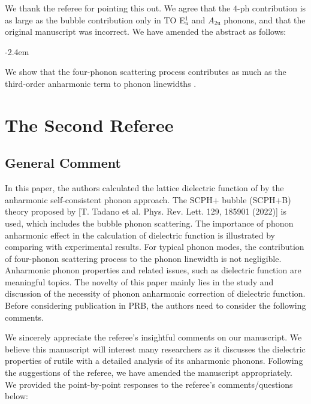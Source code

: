\documentclass[luatex,onecolumn,showpacs,aps,preprint,prb,amsfonts,amsmath,amssymb,floatfix,groupedaddress, longbibliography]{revtex4-2}
\renewenvironment{quote}{\begin{fquote}\advance\leftmargini -2.4em\begin{oldquote}}{\end{oldquote}\end{fquote}}
\newenvironment{fquote}
  {\def\FrameCommand{
	\fboxsep=0.6em %
	\fcolorbox{black}{white}}%
    \MakeFramed {\advance\hsize-2\width \FrameRestore}
    \begin{minipage}{\linewidth}
  }
  {\end{minipage}\endMakeFramed}
\providecommand{\DIFadd}[1]{{\protect\color{blue}\uwave{#1}}} %
\begin{document}
\AR  We thank the referee for pointing this out. We agree that the $4$-ph contribution is as large as the bubble contribution only in TO E$_{u}^{1}$ and $A_{\mathrm{2u}}$ phonons, and that the original manuscript was incorrect. We have amended the abstract as follows:

\begin{quote}
We show that the four-phonon scattering process contributes as much as the third-order anharmonic term to phonon linewidths \DIFadd{of some phonon modes}.
\end{quote}


% 
% 

\newpage
\section{The Second Referee}

\subsection{General Comment}

\RC In this paper, the authors calculated the lattice dielectric function of  by the anharmonic self-consistent phonon approach. The SCPH+
bubble (SCPH+B) theory proposed by [T. Tadano et al. Phys. Rev. Lett. 129, 185901 (2022)] is used, which includes the bubble phonon scattering. The importance of phonon anharmonic effect in the calculation of dielectric function is illustrated by comparing with experimental results. For typical phonon modes, the contribution of four-phonon scattering process to the phonon linewidth is not negligible. Anharmonic phonon properties and related issues, such as dielectric function are meaningful topics. The novelty of this paper mainly lies in the study and discussion of the necessity of phonon anharmonic correction of dielectric function. Before considering publication in PRB, the authors need to consider the following comments.

\AR We sincerely appreciate the referee’s insightful comments on our manuscript. We believe this manuscript will interest many researchers as it discusses the dielectric properties of rutile  with a detailed analysis of its anharmonic phonons. Following the suggestions of the referee, we have amended the manuscript appropriately. We provided the point-by-point responses to the referee’s comments/questions below:
\end{document}
